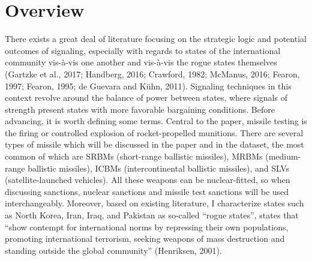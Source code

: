 \documentclass[12pt]{article}
\begin{document}
\section{Overview} 
There exists a great deal of literature focusing on the strategic logic and potential outcomes of signaling, especially with regards to states of the international community vis-à-vis one another and vis-à-vis the rogue states themselves (Gartzke et al., 2017; Handberg, 2016; Crawford, 1982; McManus, 2016; Fearon, 1997; Fearon, 1995; de Guevara and Kühn, 2011). Signaling techniques in this context revolve around the balance of power between states, where signals of strength present states with more favorable bargaining conditions. 
Before advancing, it is worth defining some terms. Central to the paper, missile testing is the firing or controlled explosion of rocket-propelled munitions. There are several types of missile which will be discussed in the paper and in the dataset, the most common of which are SRBMs (short-range ballistic missiles), MRBMs (medium-range ballistic missiles), ICBMs (intercontinental ballistic missiles), and SLVs (satellite-launched vehicles). All these weapons can be nuclear-fitted, so when discussing sanctions, nuclear sanctions and missile test sanctions will be used interchangeably. Moreover, based on existing literature, I characterize states such as North Korea, Iran, Iraq, and Pakistan as so-called “rogue states”, states that “show contempt for international norms by repressing their own populations, promoting international terrorism, seeking weapons of mass destruction and standing outside the global community” (Henriksen, 2001).  
\end{document}
